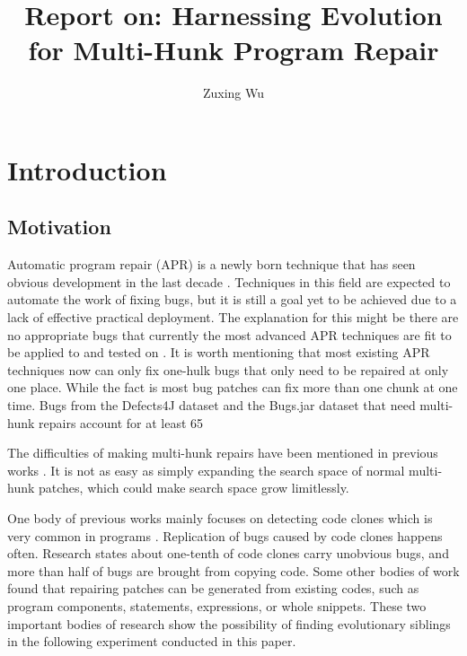 \documentclass[runningheads]{llncs}
\begin{document}
%
\title{Report on: Harnessing Evolution for Multi-Hunk Program Repair}
%
%
\author{Zuxing Wu}
%
%
%
\maketitle              %
%
%
\section{Introduction}
\subsection{Motivation}
Automatic program repair (APR) is a newly born technique that has seen obvious development in the last decade \cite{1_ref_proc2,2_ref_article1}. Techniques in this field are expected to automate the work of fixing bugs, but it is still a goal yet to be achieved due to a lack of effective practical deployment. The explanation for this might be there are no appropriate bugs that currently the most advanced APR techniques are fit to be applied to and tested on \cite{3_ref_article2,4_ref_proc3}. It is worth mentioning that most existing APR techniques now can only fix one-hulk bugs that only need to be repaired at only one place. While the fact is most bug patches can fix more than one chunk at one time. Bugs from the Defects4J dataset \cite{6_ref_proc5} and the Bugs.jar dataset \cite{7_ref_proc6} that need multi-hunk repairs account for at least 65%

The difficulties of making multi-hunk repairs have been mentioned in previous works \cite{4_ref_proc3,5_ref_proc4}. It is not as easy as simply expanding the search space of normal multi-hunk patches, which could make search space grow limitlessly. 

One body of previous works mainly focuses on detecting code clones which is very common in programs \cite{8_ref_article3,9_ref_proc7,10_ref_proc8,11_ref_proc9,12_ref_article4,13_ref_proc10,14_ref_proc11,15_ref_proc12,16_ref_proc13,17_ref_proc14}. Replication of bugs caused by code clones happens often. Research \cite{20_ref_proc15} states about one-tenth of code clones carry unobvious bugs, and more than half of bugs are brought from copying code. Some other bodies of work \cite{27_ref_proc17,28_ref_proc18,29_ref_proc19,30_ref_proc20} found that repairing patches can be generated from existing codes, such as program components, statements, expressions, or whole snippets. These two important bodies of research show the possibility of finding evolutionary siblings in the following experiment conducted in this paper.
\end{document}
